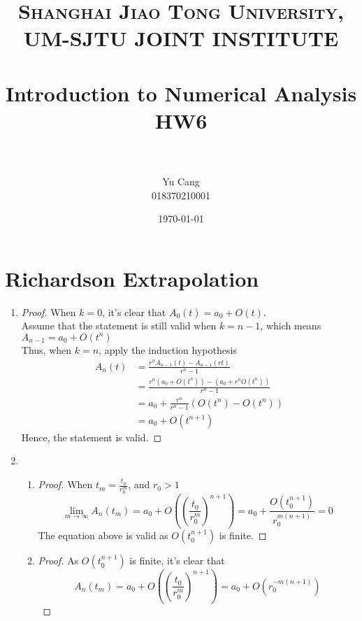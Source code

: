 \documentclass[paper=a4, fontsize=11pt]{scrartcl} %
\title{	
\normalfont \normalsize 
\textsc{Shanghai Jiao Tong University, UM-SJTU JOINT INSTITUTE} \\ [25pt] %
\horrule{0.5pt} \\[0.4cm] %
\huge Introduction to Numerical Analysis \\ HW6 \\ %
\horrule{2pt} \\[0.5cm] %
}
\author{Yu Cang \\ 018370210001} %
\date{\normalsize \today} %
\numberwithin{equation}{section} %
\numberwithin{figure}{section} %
\numberwithin{table}{section} %
\begin{document}
\maketitle %

\section{Richardson Extrapolation}
\begin{enumerate}
	\item 
		\begin{proof}
			When $k = 0$, it's clear that $A_0(t) = a_0 + O(t)$.\\
			Assume that the statement is still valid when $k=n-1$, which means $A_{n-1} = a_0 + O(t^n)$\\
			Thus, when $k = n$, apply the induction hypothesis
			\begin{equation}
				\begin{aligned}
					A_n(t) & = \frac{r^n A_{n-1}(t) - A_{n-1}(rt)}{r^n-1}\\
					          & = \frac{r^n (a_0 + O(t^n)) - (a_0 + r^n O(t^n))}{r^n-1}\\
					          & = a_0 + \frac{r^n}{r^n-1} (O(t^n) - O(t^n))\\
					          & = a_0 + O(t^{n+1})
				\end{aligned}
			\end{equation}
			Hence, the statement is valid.
		\end{proof}
	\item
		\begin{enumerate}
			\item 
				\begin{proof}
					When $t_m = \frac{t_0}{r_0^m}$, and $r_0 > 1$
					\begin{equation}
						\lim\limits_{m\rightarrow\infty} A_n(t_m) = a_0 + O((\frac{t_0}{r_0^m})^{n+1}) = a_0 + \frac{O(t_0 ^ {n+1})}{r_0^{m(n+1)}} = 0
					\end{equation}
					The equation above is valid as $O(t_0 ^{n+1})$ is finite.
			\end{proof}
			
			\item 
				\begin{proof}
					As $O(t_0 ^{n+1})$ is finite, it's clear that
					\begin{equation}
						 A_n(t_m) = a_0 + O((\frac{t_0}{r_0^m})^{n+1}) = a_0 + O(r_0^{-m(n+1)})
					\end{equation}
				\end{proof}
			

\end{enumerate}
\end{enumerate}
\end{document}

